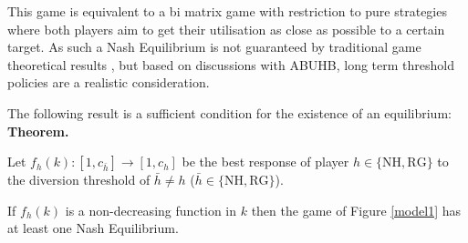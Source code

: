 \documentclass{article}
\newcommand{\NH}{\text{NH}}
\newcommand{\RG}{\text{RG}}
\begin{document}
This game is equivalent to a bi matrix game with restriction to pure strategies where both players aim to get their utilisation as close as possible to a certain target.
As such a Nash Equilibrium is not guaranteed by traditional game theoretical results \cite{Nash1950}, but based on discussions with ABUHB, long term threshold policies are a realistic consideration.

The following result is a sufficient condition for the existence of an equilibrium:\\


\textbf{Theorem.}

Let $f_{h}(k):[1,c_{\bar h}]\to[1,c_h]$ be the best response of player $h\in\{\NH, \RG\}$ to the diversion threshold of $\bar h\ne h$ ($\bar h\in\{\NH, \RG\}$).

If $f_{h}(k)$ is a non-decreasing function in $k$ then the game of Figure \ref{model1} has at least one Nash Equilibrium.
\end{document}
